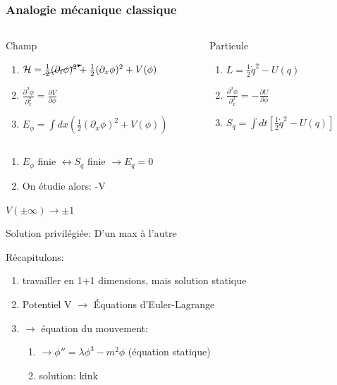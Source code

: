 \documentclass[handout]{beamer}
\begin{document}
\begin{frame} \frametitle{Analogie mécanique classique}
\begin{columns}
    \begin{column}{.55\linewidth}
    Champ
    \begin{enumerate}
    \item $\mathcal{H} =  \cancelto{}{\frac{1}{2}  (\partial_t \phi)^2} +  \frac{1}{2}  (\partial_x \phi)^2 +V(\phi) $
    \item $\frac{\partial^2\phi}{\partial_x^2} = \frac{\partial V}{\partial\phi}$
    \item $E_\phi = \int{dx(\frac{1}{2}  (\partial_x \phi)^2 +V(\phi) )}$
    \end{enumerate}
    \end{column}
    \begin{column}{.45\linewidth}
	Particule
    \begin{enumerate}
    \item $L =   \frac{1}{2}  \dot{q}^2 -U(q)$
    \item $\frac{\partial^2\phi}{\partial_x^2} = -\frac{\partial U}{\partial\phi}$
    \item $S_q = \int{dt[\frac{1}{2}  \dot{q}^2 -U(q)] }$
    \end{enumerate}
    \end{column}
  \end{columns}
   \begin{enumerate}
   \item $E_\phi$ finie $\leftrightarrow S_q$ finie $\rightarrow E_q = 0$
   \item On étudie alors: -V
   \end{enumerate}
  
\end{frame}

\begin{frame}
$V(\pm \infty) \rightarrow \pm 1$
\begin{figure}
\end{figure}
Solution privilégiée: D'un max à l'autre
\end{frame}

\begin{frame}
Récapitulons:
\begin{enumerate}
\item travailler en 1+1 dimensions, mais solution statique
\item Potentiel V $\rightarrow$ Équations d'Euler-Lagrange 
\item $\rightarrow$ équation du mouvement: 
\begin{enumerate}
\item $\rightarrow \phi'' = \lambda \phi^3 - m^2 \phi$ (équation statique)
\item solution: kink
\end{enumerate}
\end{enumerate}
\end{frame}
\end{document}
